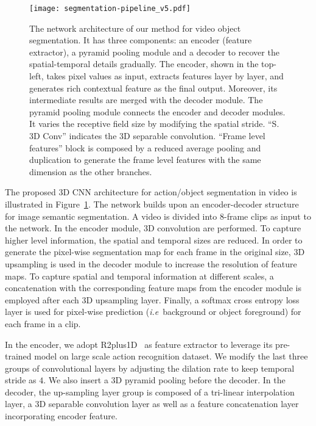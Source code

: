 \documentclass{bmvc2k}
\def\ie{\emph{i.e}\bmvaOneDot}
\begin{document}
\begin{figure}[!t]
\centering
\texttt{[image: segmentation-pipeline\_v5.pdf]}
\caption{The network architecture of our method for video object segmentation. It has three components: an encoder (feature extractor), a pyramid pooling module and a decoder to recover the spatial-temporal details gradually. The encoder, shown in the top-left, takes pixel values as input, extracts features layer by layer, and generates rich contextual feature as the final output. Moreover, its intermediate results are merged with the decoder module. The pyramid pooling module connects the encoder and decoder modules. It varies the receptive field size by modifying the spatial stride. ``S. 3D Conv'' indicates the 3D separable convolution. ``Frame level features'' block is composed by a reduced average pooling and duplication to generate the frame level features with the same dimension as the other branches.
}
\label{fig:segmentation}
\end{figure}


The proposed 3D CNN architecture for action/object segmentation in video is illustrated in Figure~\ref{fig:segmentation}.
The network builds upon an encoder-decoder structure for image semantic segmentation. 
A video is divided into 8-frame clips as input to the network. In the encoder module, 3D convolution are performed. To capture higher level information, the spatial and temporal sizes are reduced. In order to generate the pixel-wise segmentation map for each frame in the original size, 3D upsampling is used in the decoder module to increase the resolution of feature maps. To capture spatial and temporal information at different scales, a concatenation with the corresponding feature maps from the encoder module is employed after each 3D upsampling layer. Finally, a softmax cross entropy loss layer is used for pixel-wise prediction (\ie~background or object foreground) for each frame in a clip.

In the encoder, we adopt R2plus1D~\cite{r2plus1d_cvpr18} as feature extractor to leverage its pre-trained model on large scale action recognition dataset. We modify the last three groups of convolutional layers by adjusting the dilation rate to keep temporal stride as $4$.
We also insert a 3D pyramid pooling before the decoder. 
In the decoder, the up-sampling layer group is composed of a tri-linear interpolation layer, a 3D separable convolution layer as well as a feature concatenation layer incorporating encoder feature. 
\end{document}
